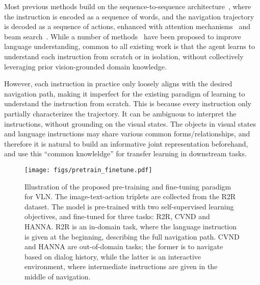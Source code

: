 \documentclass[10pt,twocolumn,letterpaper]{article}
\begin{document}
Most previous methods build on the sequence-to-sequence architecture~\cite{sutskever2014sequence}, where the instruction is encoded as a sequence of words, and the navigation trajectory is decoded as a sequence of actions, enhanced with attention mechanisms~\cite{anderson2018vision,wang2018reinforced,ma2019self} and beam search~\cite{fried2018speaker}.  While a number of methods~\cite{misra2017mapping,monroe2017colors,wang2018look} have been proposed to improve language understanding, common to all existing work is that the agent learns to understand each instruction from scratch or in isolation, without collectively leveraging prior vision-grounded domain knowledge.

However, each instruction in practice only loosely aligns with the desired navigation path, making it imperfect for the existing paradigm of learning to understand the instruction from scratch. This is because 
 every instruction only partially characterizes the trajectory. It can be ambiguous to interpret the instructions, without grounding on the visual states. 
 The objects in visual states and language instructions may share various common forms/relationships, and therefore it is natural to build an informative joint representation beforehand, and use this ``common knowleldge'' for transfer learning in downstream tasks.

\begin{figure}[t!]\vspace{-0mm}\centering
	\texttt{[image: figs/pretrain\_finetune.pdf]}  
	\vspace{-0mm}
	\caption{Illustration of the proposed pre-training and fine-tuning paradigm for VLN. The image-text-action triplets are collected from the R2R dataset. The model is pre-trained with two self-supervised learning objectives, and fine-tuned for three tasks: R2R, CVND and HANNA. R2R is an in-domain task, where the language instruction is given at the beginning, describing the full navigation path. CVND and HANNA are out-of-domain tasks; the former is to navigate based on dialog history, while the latter is an interactive environment, where intermediate instructions are given in the middle of navigation.}
	\vspace{-3mm}
	\label{fig:pretrainig_finetuning_scheme}
\end{figure}
\end{document}
